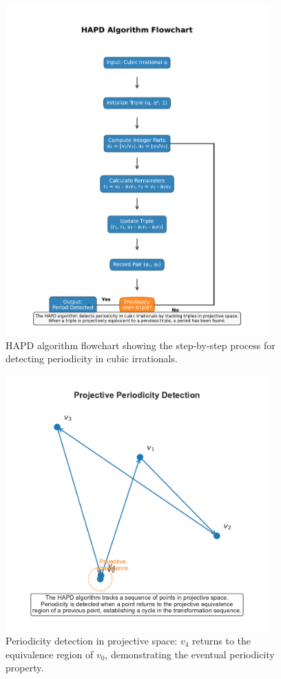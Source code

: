 \begin{theorem}
\begin{figure}[htbp]
\centering
\includegraphics[width=0.9\textwidth]{figures/output/hapd_algorithm_flowchart.pdf}
\caption{HAPD algorithm flowchart showing the step-by-step process for detecting periodicity in cubic irrationals.}
\label{fig:hapd_flowchart}
\end{figure}

\begin{figure}[htbp]
\centering
\includegraphics[width=0.9\textwidth]{figures/output/projective_periodicity_visualization.pdf}
\caption{Periodicity detection in projective space: $v_4$ returns to the equivalence region of $v_0$, demonstrating the eventual periodicity property.}
\label{fig:projective_visualization}
\end{figure}


\end{theorem}
